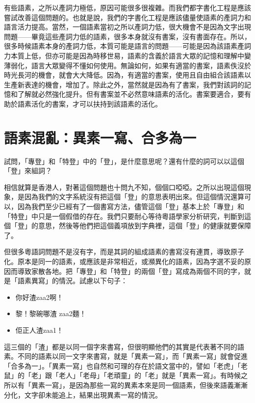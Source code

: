 \documentclass[a5paper, 12pt, openany]{book} %
\begin{document}
有些語素，之所以產詞力極低，原因可能很多很複雜。而我們都字書化工程是應該嘗試改善這個問題的。也就是說，我們的字書化工程是應該儘量使語素的產詞力和語言活力提高。當然，一個語素當初之所以產詞力低，很大機會不是因為文字出現問題——畢竟這些產詞力低的語素，很多本身就沒有書案，沒有書面存在。所以，很多時候語素本身的產詞力低，本質可能是語言的問題——可能是因為該語素產詞力本質上低，但亦可能是因為時移世易，語素的含義於語言大眾的記憶和理解中變薄弱化，語言大眾變得不懂如何使用。無論如何，如果有適當的書案，語素佚沒於時光長河的機會，就會大大降低。因為，有適當的書案，使用且自由組合該語素以生產新表達的機會，增加了。除此之外，當然就是因為有了書案，我們對該詞的記憶和了解就必然強化提升。但有書案並不必然意味語素的活化。書案要適合，要有助於語素活化的書案，才可以扶持到該語素的活化。

\section{語素混亂：異素一寫、合多為一}

試問，「專登」和「特登」中的「登」，是什麼意思呢？還有什麼的詞可以以這個「登」來組詞？

相信就算是香港人，對著這個問題也十問九不知，個個口啞啞。之所以出現這個現象，是因為我們的文字系統沒有把這個「登」的意思表明出來。但這個情況還算可以，因為我們至少已經有了一個書寫方法，儘管這個「登」基本上於「專登」和「特登」中只是一個假借的存在。我們只要耐心等待粵語學家分析研究，判斷到這個「登」的意思，然後等他們把這個義項放到字典裡，這個「登」的健康就要保障了。

但很多粵語詞問題不是沒有字，而是其詞的組成語素的書寫沒有連貫，導致原子化。原本是同一的語素，或應該是非常相近，或瀕異化的語素，因為字選不妥的原因而導致家散各地。把「專登」和「特登」的兩個「登」寫成為兩個不同的字，就是「語素異寫」的情況。試慮以下句子：

\begin{itemize}
\item 你好渣zaa2啊！
\item 黎！黎碗哪渣 zaa2麵！
\item 佢正人渣zaa1！
\end{itemize}




這三個的「渣」都是以同一個字來書寫，但很明顯他們的其實是代表著不同的語素。不同的語素以同一文字來書寫，就是「異素一寫」，而「異素一寫」就會促進「合多為一」。「異素一寫」也自然和可理的存在於語文當中的，譬如「老虎」「老鼠」的「老」跟「老人」「老母」「老頑童」的「老」就是「異素一寫」。有時候之所以有「異素一寫」，是因為那些一寫的異素本來是同一個語素，但後來語義漸漸分化，文字卻未能追上，結果出現異素一寫的情況。
\end{document}
